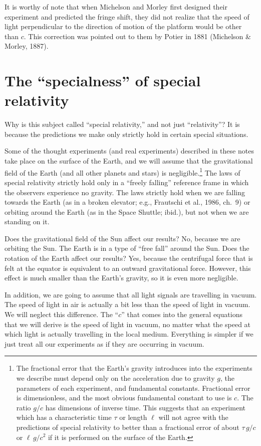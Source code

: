 It is worthy of note that when Michelson and Morley first designed
their experiment and predicted the fringe shift, they did not realize
that the speed of light perpendicular to the direction of motion of
the platform would be other than $c$.  This correction was pointed out
to them by Potier in 1881 (Michelson \& Morley, 1887).


\section{The ``specialness'' of special relativity}
\label{sec:approximations}

Why is this subject called ``special relativity,'' and not just
``relativity''?  It is because the predictions we make only strictly
hold in certain special situations.

Some of the thought experiments (and real experiments) described in
these notes take place on the surface of the Earth, and we will assume
that the gravitational field of the Earth (and all other planets and
stars) is negligible.\footnote{The fractional error that the Earth's
gravity introduces into the experiments we describe must depend only
on the acceleration due to gravity $g$, the parameters of each
experiment, and fundamental constants.  Fractional error is
dimensionless, and the most obvious fundamental constant to use is
$c$.  The ratio $g/c$ has dimensions of inverse time.  This suggests
that an experiment which has a characteristic time $\tau$ or length
$\ell$ will not agree with the predictions of special relativity to
better than a fractional error of about $\tau\, g/c$ or $\ell\, g/c^2$
if it is performed on the surface of the Earth.}  The laws of special
relativity strictly hold only in a ``freely falling'' reference frame
in which the observers experience no gravity.  The laws strictly hold
when we are falling towards the Earth (as in a broken elevator; e.g.,
Frautschi et al., 1986, ch.~9) or orbiting around the Earth (as in the
Space Shuttle; ibid.), but not when we are standing on it.

Does the gravitational field of the Sun affect our results?  No,
because we are orbiting the Sun.  The Earth is in a type of ``free
fall'' around the Sun.  Does the rotation of the Earth affect our
results?  Yes, because the centrifugal force that is felt at the
equator is equivalent to an outward gravitational force.  However,
this effect is much smaller than the Earth's gravity, so it is even
more negligible.

In addition, we are going to assume that all light signals are
travelling in vacuum.  The speed of light in air is actually a bit
less than the speed of light in vacuum.  We will neglect this
difference.  The ``$c$'' that comes into the general equations that we
will derive is the speed of light in vacuum, no matter what the speed
at which light is actually travelling in the local medium.  Everything
is simpler if we just treat all our experiments as if they are
occurring in vacuum.

